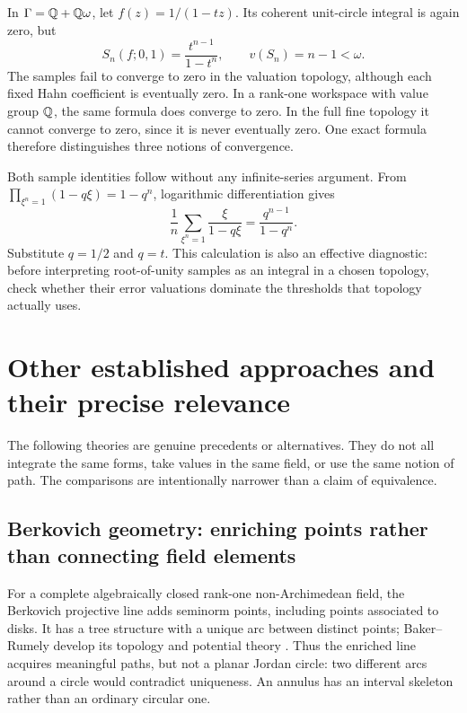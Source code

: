 \documentclass[11pt,letterpaper]{article}
\theoremstyle{definition}
\theoremstyle{remark}
\numberwithin{equation}{section}
\begin{document}
\begin{example}\label{ex:highranksampling}
In $\Gamma=\mathbb Q+\mathbb Q\omega$, let $f(z)=1/(1-tz)$. Its coherent unit-circle integral is again zero, but
\begin{equation}\label{eq:highranksample}
 S_n(f;0,1)=\frac{t^{n-1}}{1-t^n},\qquad
 v(S_n)=n-1<\omega.
\end{equation}
The samples fail to converge to zero in the valuation topology, although each fixed Hahn coefficient is eventually zero. In a rank-one workspace with value group $\mathbb Q$, the same formula does converge to zero. In the full fine topology it cannot converge to zero, since it is never eventually zero. One exact formula therefore distinguishes three notions of convergence.
\end{example}

Both sample identities follow without any infinite-series argument. From
$\prod_{\xi^n=1}(1-q\xi)=1-q^n$, logarithmic differentiation gives
\[
 \frac1n\sum_{\xi^n=1}\frac{\xi}{1-q\xi}
       =\frac{q^{n-1}}{1-q^n}.
\]
Substitute $q=1/2$ and $q=t$. This calculation is also an effective diagnostic: before interpreting root-of-unity samples as an integral in a chosen topology, check whether their error valuations dominate the thresholds that topology actually uses.

\section{Other established approaches and their precise relevance}\label{sec:alternatives}
The following theories are genuine precedents or alternatives. They do not all integrate the same forms, take values in the same field, or use the same notion of path. The comparisons are intentionally narrower than a claim of equivalence.

\subsection{Berkovich geometry: enriching points rather than connecting field elements}
For a complete algebraically closed rank-one non-Archimedean field, the Berkovich projective line adds seminorm points, including points associated to disks. It has a tree structure with a unique arc between distinct points; Baker--Rumely develop its topology and potential theory \cite{BR}. Thus the enriched line acquires meaningful paths, but not a planar Jordan circle: two different arcs around a circle would contradict uniqueness. An annulus has an interval skeleton rather than an ordinary circular one.
\end{document}
